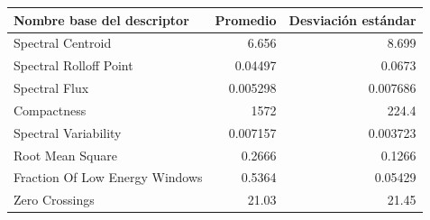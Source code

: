 \begin{center}\small
{}\label{tab:descriptores}
\begin{tabularx}{\linewidth}{@{}Y r r@{}}
\toprule
\textbf{Nombre base del descriptor} & \textbf{Promedio} & \textbf{Desviación estándar} \\
\midrule
Spectral Centroid & 6.656 & 8.699 \\
Spectral Rolloff Point & 0.04497 & 0.0673 \\
Spectral Flux & 0.005298 & 0.007686 \\
Compactness & 1572 & 224.4 \\
Spectral Variability & 0.007157 & 0.003723 \\
Root Mean Square & 0.2666 & 0.1266 \\
Fraction Of Low Energy Windows & 0.5364 & 0.05429 \\
Zero Crossings & 21.03 & 21.45 \\
\bottomrule
\end{tabularx}
\end{center}
